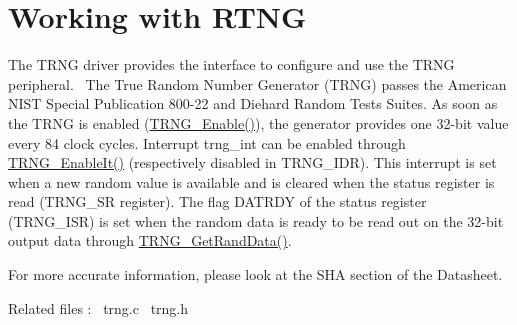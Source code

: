 \hypertarget{group__rtng__module}{}\section{Working with R\+T\+NG}
\label{group__rtng__module}
The T\+R\+NG driver provides the interface to configure and use the T\+R\+NG peripheral.~\newline
 The True Random Number Generator (T\+R\+NG) passes the American N\+I\+ST Special Publication 800-\/22 and Diehard Random Tests Suites. As soon as the T\+R\+NG is enabled (\mbox{\hyperlink{trng_8c_abeb3609e1c787c2077b8c919d055ccee}{T\+R\+N\+G\+\_\+\+Enable()}}), the generator provides one 32-\/bit value every 84 clock cycles. Interrupt trng\+\_\+int can be enabled through \mbox{\hyperlink{trng_8c_af96e24c24737b834f3dbb232ed043f13}{T\+R\+N\+G\+\_\+\+Enable\+It()}} (respectively disabled in T\+R\+N\+G\+\_\+\+I\+DR). This interrupt is set when a new random value is available and is cleared when the status register is read (T\+R\+N\+G\+\_\+\+SR register). The flag D\+A\+T\+R\+DY of the status register (T\+R\+N\+G\+\_\+\+I\+SR) is set when the random data is ready to be read out on the 32-\/bit output data through \mbox{\hyperlink{trng_8c_afcbb6fe55bfe5b04f3a98a3895a6c917}{T\+R\+N\+G\+\_\+\+Get\+Rand\+Data()}}.

For more accurate information, please look at the S\+HA section of the Datasheet.

Related files \+:~\newline
trng.\+c~\newline
 trng.\+h~\newline
 